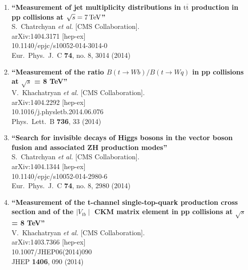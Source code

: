 \documentclass{article}
\begin{document}
\begin{enumerate}
\item%
{\bf ``Measurement of jet multiplicity distributions in $\mathrm {t}\overline{\mathrm {t}}$ production in pp collisions at $\sqrt{s} = 7\,\rm  {TeV} $''}
  \\{}S.~Chatrchyan {\it et al.}  [CMS Collaboration].
  \\{}arXiv:1404.3171 [hep-ex]
    \\{}10.1140/epjc/s10052-014-3014-0
\\{}Eur.\ Phys.\ J.\ C {\bf 74}, no. 8, 3014 (2014) %


\item%
{\bf ``Measurement of the ratio $B(t \to Wb)/B(t \to Wq)$ in pp collisions at $\sqrt{s}$ = 8 TeV''}
  \\{}V.~Khachatryan {\it et al.}  [CMS Collaboration].
  \\{}arXiv:1404.2292 [hep-ex]
    \\{}10.1016/j.physletb.2014.06.076
\\{}Phys.\ Lett.\ B {\bf 736}, 33 (2014) %


\item%
{\bf ``Search for invisible decays of Higgs bosons in the vector boson fusion and associated ZH production modes''}
  \\{}S.~Chatrchyan {\it et al.}  [CMS Collaboration].
  \\{}arXiv:1404.1344 [hep-ex]
    \\{}10.1140/epjc/s10052-014-2980-6
\\{}Eur.\ Phys.\ J.\ C {\bf 74}, no. 8, 2980 (2014) %


\item%
{\bf ``Measurement of the t-channel single-top-quark production cross section and of the $\mid V_{tb} \mid$ CKM matrix element in pp collisions at $\sqrt{s}$= 8 TeV''}
  \\{}V.~Khachatryan {\it et al.}  [CMS Collaboration].
  \\{}arXiv:1403.7366 [hep-ex]
    \\{}10.1007/JHEP06(2014)090
\\{}JHEP {\bf 1406}, 090 (2014) %



\end{enumerate}
\end{document}
